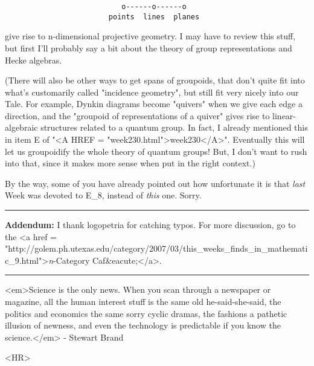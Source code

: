 \begin{verbatim}
                           o------o------o
                        points  lines  planes      
\end{verbatim}
    
give rise to n-dimensional projective geometry.  I may have to review
this stuff, but first I'll probably say a bit about the theory of 
group representations and Hecke algebras.

(There will also be other ways to get spans of groupoids, that don't
quite fit into what's customarily called "incidence
geometry", but still fit very nicely into our Tale.  For example,
Dynkin diagrams become "quivers" when we give each edge a
direction, and the "groupoid of representations of a quiver"
gives rise to linear-algebraic structures related to a quantum group.
In fact, I already mentioned this in item E of "<A HREF =
"week230.html">week230</A>".  Eventually this will let us
groupoidify the whole theory of quantum groups!  But, I don't want to
rush into that, since it makes more sense when put in the right
context.)


By the way, some of you have already pointed out how unfortunate it is
that \emph{last} Week was devoted to E_{8}, instead of
\emph{this} one.  Sorry.

\par\noindent\rule{\textwidth}{0.4pt}
\textbf{Addendum:} I thank logopetria for catching typos.
For more discussion, go to the <a href = "http://golem.ph.utexas.edu/category/2007/03/this_weeks_finds_in_mathematic_9.html">\emph{n}-Category 
Caf&eacute;</a>.

\par\noindent\rule{\textwidth}{0.4pt}
<em>Science is the only news. When you scan through a newspaper or magazine, 
all the human interest stuff is the same old he-said-she-said, the politics 
and economics the same sorry cyclic dramas, the fashions a pathetic illusion 
of newness, and even the technology is predictable if you know the 
science.</em> - Stewart Brand

<HR>



